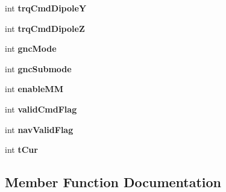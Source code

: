 \begin{DoxyCompactItemize}
\item 
int {\bfseries trq\+Cmd\+DipoleY}\hypertarget{classisat__trek_1_1_g_n_c1___telemetry_a49a04e93a03636dd9f3e4f73fbd4d95d}{}\label{classisat__trek_1_1_g_n_c1___telemetry_a49a04e93a03636dd9f3e4f73fbd4d95d}

\item 
int {\bfseries trq\+Cmd\+DipoleZ}\hypertarget{classisat__trek_1_1_g_n_c1___telemetry_ad6702058bda4088d4f13e038d8fb436c}{}\label{classisat__trek_1_1_g_n_c1___telemetry_ad6702058bda4088d4f13e038d8fb436c}

\item 
int {\bfseries gnc\+Mode}\hypertarget{classisat__trek_1_1_g_n_c1___telemetry_a7eb3b64dcff3a870412359b11f0f30d2}{}\label{classisat__trek_1_1_g_n_c1___telemetry_a7eb3b64dcff3a870412359b11f0f30d2}

\item 
int {\bfseries gnc\+Submode}\hypertarget{classisat__trek_1_1_g_n_c1___telemetry_a60ce96a0e50f002350c46cb9c08289b6}{}\label{classisat__trek_1_1_g_n_c1___telemetry_a60ce96a0e50f002350c46cb9c08289b6}

\item 
int {\bfseries enable\+MM}\hypertarget{classisat__trek_1_1_g_n_c1___telemetry_aee01d886ebfeba89cd0315bae7032292}{}\label{classisat__trek_1_1_g_n_c1___telemetry_aee01d886ebfeba89cd0315bae7032292}

\item 
int {\bfseries valid\+Cmd\+Flag}\hypertarget{classisat__trek_1_1_g_n_c1___telemetry_a0de4fa66ddfc905bd16fdc8fe48b0f45}{}\label{classisat__trek_1_1_g_n_c1___telemetry_a0de4fa66ddfc905bd16fdc8fe48b0f45}

\item 
int {\bfseries nav\+Valid\+Flag}\hypertarget{classisat__trek_1_1_g_n_c1___telemetry_a1e203f5b20118db4d95e9b225bf24228}{}\label{classisat__trek_1_1_g_n_c1___telemetry_a1e203f5b20118db4d95e9b225bf24228}

\item 
int {\bfseries t\+Cur}\hypertarget{classisat__trek_1_1_g_n_c1___telemetry_a223ca16f22317b227d9ea4919259c3c7}{}\label{classisat__trek_1_1_g_n_c1___telemetry_a223ca16f22317b227d9ea4919259c3c7}

\end{DoxyCompactItemize}


\subsection{Member Function Documentation}
